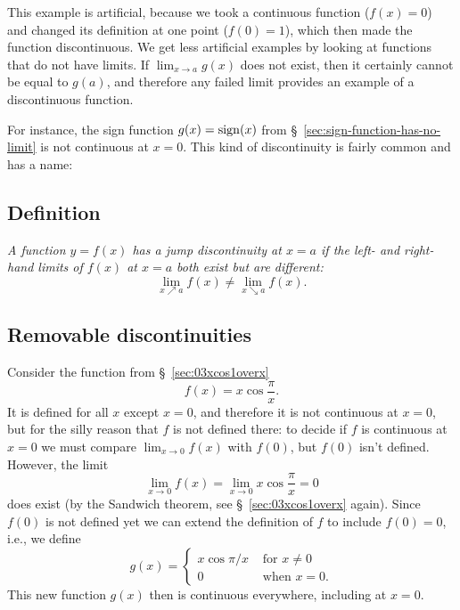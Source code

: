 This example is artificial, because we took a continuous function
($f(x) = 0$) and changed its definition at one point ($f(0) = 1$),
which then made the function discontinuous.  We get less artificial
examples by looking at functions that do not have limits.  If
$\lim_{x\to a} g(x)$ does not exist, then it certainly cannot be equal
to $g(a)$, and therefore any failed limit provides an example of a
discontinuous function.

For instance, the sign function $g(x) = \mathop{\mathrm{sign}}(x)$ from
\S~\ref{sec:sign-function-has-no-limit} is not continuous at $x=0$.
This kind of discontinuity is fairly common and has a name:

\subsection{Definition}%
\itshape  A function $y=f(x)$ has a \emph{jump discontinuity} at $x=a$
if the left- and right-hand limits of $f(x)$  at $x=a$ both exist but are
different:
\[
\lim_{x\nearrow a} f(x) \neq \lim_{x\searrow a} f(x).
\]
\upshape

\subsection{Removable discontinuities} 
\label{sec:removable-discontinuities}
Consider the function from \S~\ref{sec:03xcos1overx}
\[
f(x) = x\cos\frac{\pi} {x}.
\]
It is defined for all $x$ except $x=0$, and therefore it is not continuous at
$x=0$, but for the silly reason that $f$ is not defined there: to decide if $f$
is continuous at $x=0$ we must compare $\lim_{x\to0} f(x)$ with $f(0)$,
but $f(0)$ isn't defined.  However, the limit
\[
\lim_{x\to 0} f(x) =\lim_{x\to 0} x \cos\frac{\pi} {x} = 0
\]
does exist (by the Sandwich theorem, see \S~\ref{sec:03xcos1overx}
again).
\marginpar{}
Since $f(0)$ is not defined yet we can extend the
definition of $f$ to include $f(0) = 0$, i.e., we define
\[
g(x) =
\begin{cases}
  x\cos \pi/x & \text{ for }x\neq0\\
  0 & \text{ when }x=0 .
\end{cases}
\]
This new function $g(x)$ then is continuous everywhere, including at $x=0$.

